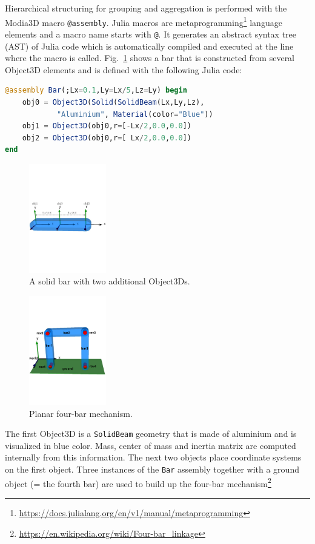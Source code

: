 Hierarchical structuring for grouping and aggregation is performed with the Modia3D macro \texttt{@assembly}. Julia macros are metaprogramming\footnote{\href{https://docs.julialang.org/en/v1/manual/metaprogramming}{https://docs.julialang.org/en/v1/manual/metaprogramming}} language elements and a macro name starts with \texttt{@}. It generates an abstract syntax tree (AST) of Julia code which is automatically compiled and executed at the line where the macro is called. 
Fig.~\ref{fig:bar} shows a bar that is constructed from several Object3D elements
and is defined with the following Julia code:
\begin{lstlisting}[language = Julia]
@assembly Bar(;Lx=0.1,Ly=Lx/5,Lz=Ly) begin 
    obj0 = Object3D(Solid(SolidBeam(Lx,Ly,Lz), 
			"Aluminium", Material(color="Blue"))
	obj1 = Object3D(obj0,r=[-Lx/2,0.0,0.0]) 
	obj2 = Object3D(obj0,r=[ Lx/2,0.0,0.0]) 
end
\end{lstlisting}
\begin{figure}[htb]
	\centering
	\includegraphics[width=0.3\textwidth]{figures/bar.pdf}  
	\caption{A solid bar with two additional Object3Ds.\label{fig:bar}}
\end{figure}
\begin{figure}[htb]
	\centering
	\includegraphics[width=0.3\textwidth]{figures/fourBar.pdf}  
	\caption{Planar four-bar mechanism.\label{fig:Fourbar}}
\end{figure}
The first Object3D is a \texttt{SolidBeam} geometry that is made of aluminium and is visualized in blue color. Mass, center of mass and inertia matrix are computed internally from this information. The next two objects place coordinate systems on the first object. Three instances of the \texttt{Bar} assembly together with a ground object  (= the fourth bar) are used to build up the four-bar mechanism\footnote{\href{https://en.wikipedia.org/wiki/Four-bar\_linkage}{https://en.wikipedia.org/wiki/Four-bar\_linkage}}
